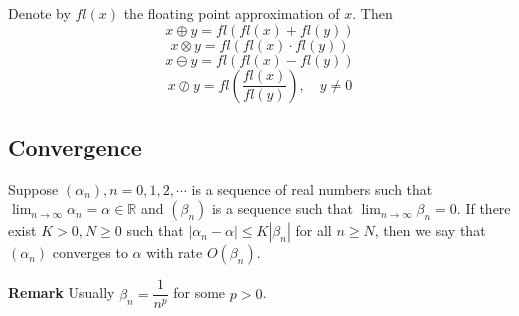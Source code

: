 \documentclass[main.tex]{subfiles}
\begin{document}
\begin{definition}
    Denote by $fl(x)$ the floating point approximation of $x$. Then 
\begin{equation}
    x \oplus y = fl(fl(x) + fl(y))
\end{equation}
\begin{equation}
    x \otimes y = fl(fl(x) \cdot fl(y))
\end{equation}
\begin{equation}
    x \ominus y = fl(fl(x) - fl(y)) 
\end{equation}
\begin{equation}
    x \oslash y = fl\left(\dfrac{fl(x)}{fl(y)}\right), \quad y\neq 0 
\end{equation}
\end{definition}
\subsection{Convergence}
\begin{definition}
    Suppose $(\alpha_n), n = 0, 1, 2, \cdots $ is a sequence of real numbers such that $\lim_{n\to \infty} \alpha_n = \alpha\in \mathbb{R}$ and $(\beta_n)$ is a sequence such that $\lim_{n\to \infty} \beta_n = 0$. If there exist $K>0, N\ge 0$ such that $|\alpha_n - \alpha| \le K |\beta_n|$ for all $n \ge N$, then we say that $(\alpha_n)$ converges to $\alpha$ with rate $O(\beta_n)$. 
\end{definition}

\par \noindent \textbf{Remark} Usually $\beta_n = \dfrac{1}{n^p}$ for some $p>0$. 
\end{document}
